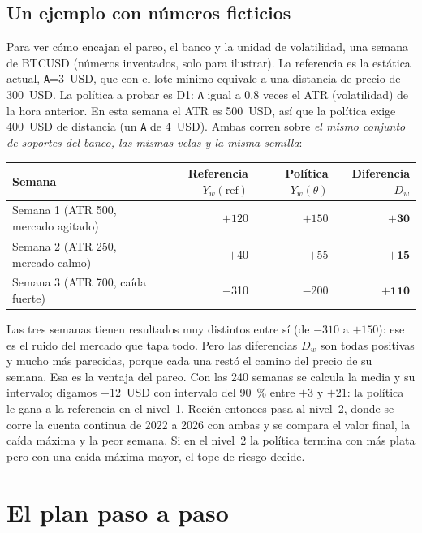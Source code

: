\documentclass[11pt,a4paper]{article}
\newcommand{\code}[1]{\texttt{\small #1}}
\newcommand{\mn}[1]{$-$#1}
\begin{document}
\subsection{Un ejemplo con números ficticios}

Para ver cómo encajan el pareo, el banco y la unidad de volatilidad, una semana de BTCUSD (números inventados, solo para
ilustrar). La referencia es la estática actual, \code{A}=3~USD, que con el lote mínimo equivale a una distancia de precio de
300~USD. La política a probar es D1: \code{A} igual a 0,8 veces el ATR (volatilidad) de la hora anterior. En esta semana el ATR
es 500~USD, así que la política exige 400~USD de distancia (un \code{A} de 4~USD). Ambas corren sobre \emph{el mismo conjunto de
soportes del banco, las mismas velas y la misma semilla}:

\begin{center}\small
\begin{tabularx}{0.92\linewidth}{Xrrr}
\toprule
Semana & Referencia $Y_w(\mathrm{ref})$ & Política $Y_w(\theta)$ & Diferencia $D_w$ \\
\midrule
Semana 1 (ATR 500, mercado agitado) & $+120$ & $+150$ & $\mathbf{+30}$ \\
Semana 2 (ATR 250, mercado calmo) & $+40$ & $+55$ & $\mathbf{+15}$ \\
Semana 3 (ATR 700, caída fuerte) & \mn{}310 & \mn{}200 & $\mathbf{+110}$ \\
\bottomrule
\end{tabularx}
\end{center}

Las tres semanas tienen resultados muy distintos entre sí (de $-310$ a $+150$): ese es el ruido del mercado que tapa todo. Pero las
diferencias $D_w$ son todas positivas y mucho más parecidas, porque cada una restó el camino del precio de su semana. Esa es la
ventaja del pareo. Con las 240 semanas se calcula la media y su intervalo; digamos $+12$~USD con intervalo del 90~\% entre
$+3$ y $+21$: la política le gana a la referencia en el nivel~1. Recién entonces pasa al nivel~2, donde se corre la cuenta continua
de 2022 a 2026 con ambas y se compara el valor final, la caída máxima y la peor semana. Si en el nivel~2 la política termina con
más plata pero con una caída máxima mayor, el tope de riesgo decide.

\section{El plan paso a paso}\label{sec:plan}
\end{document}
